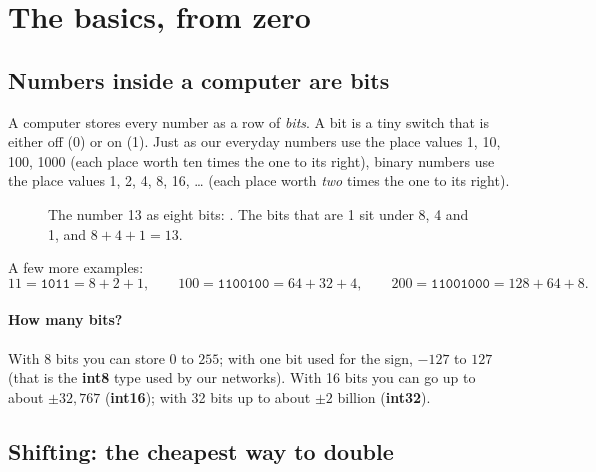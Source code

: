 \section{The basics, from zero}\label{sec:basics}

\subsection{Numbers inside a computer are bits}

A computer stores every number as a row of \emph{bits}. A bit is a tiny switch that is either
off (0) or on (1). Just as our everyday numbers use the place values 1, 10, 100, 1000 (each place
worth ten times the one to its right), binary numbers use the place values 1, 2, 4, 8, 16, \dots
(each place worth \emph{two} times the one to its right).

\begin{figure}[H]
\centering
{}
\caption{The number 13 as eight bits: . The bits that are 1 sit under 8, 4 and 1,
and $8+4+1=13$.}
\end{figure}

A few more examples:
\[
  11 = \texttt{1011} = 8+2+1,\qquad 100 = \texttt{1100100} = 64+32+4,\qquad
  200 = \texttt{11001000} = 128+64+8.
\]

\paragraph{How many bits?} With 8 bits you can store $0$ to $255$; with one bit used for the sign,
$-127$ to $127$ (that is the \textbf{int8} type used by our networks). With 16 bits you can go up
to about $\pm 32{,}767$ (\textbf{int16}); with 32 bits up to about $\pm 2$ billion (\textbf{int32}).

\subsection{Shifting: the cheapest way to double}

